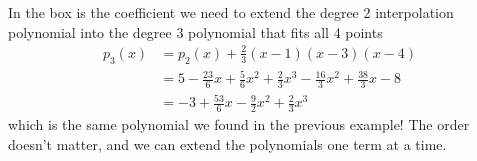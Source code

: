 {\begin{figure}[H]
\begin{tabular}{ll|lll}
\end{tabular}
\end{figure}
In the box is the coefficient we need to extend the degree 2 interpolation polynomial into the degree 3 polynomial that fits all 4 points
\begin{align*}
p_3(x) &= p_2(x) + \frac{2}{3}(x-1)(x-3)(x-4) \\
&= 5 - \frac{23}{6}x + \frac{5}{6}x^2 + \frac{2}{3}x^3 - \frac{16}{3}x^2 + \frac{38}{3}x - 8\\
&= -3 + \frac{53}{6}x - \frac{9}{2}x^2 + \frac{2}{3}x^3
\end{align*}
which is the same polynomial we found in the previous example! The order doesn't matter, and we can extend the polynomials one term at a time.
}{\downline}




